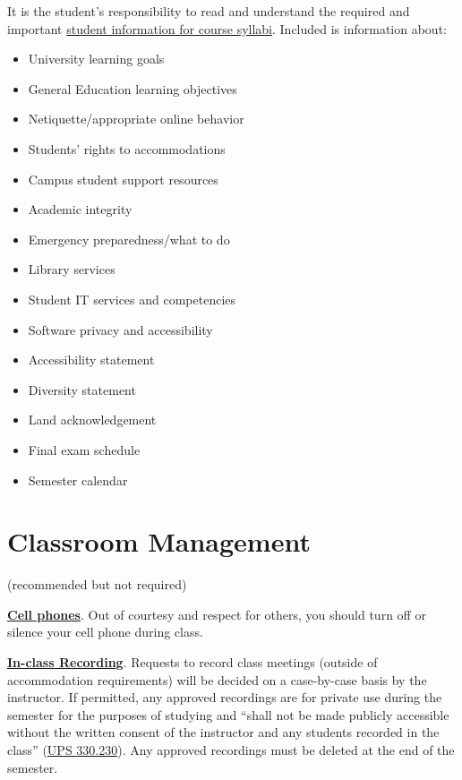 \documentclass[12pt]{article} %
\begin{document}
\noindent It is the student's responsibility to read and understand the required and important \href{https://fdc.fullerton.edu/teaching/student-info-syllabi.html}{student information for course syllabi}. Included is information about:

\begin{itemize}
\item University learning goals
\item General Education learning objectives
\item Netiquette/appropriate online behavior
\item Students' rights to accommodations
\item Campus student support resources
\item Academic integrity
\item Emergency preparedness/what to do
\item Library services
\item Student IT services and competencies
\item Software privacy and accessibility
\item Accessibility statement
\item Diversity statement
\item Land acknowledgement
\item Final exam schedule
\item Semester calendar
\end{itemize}

\section*{Classroom Management} {\color{annotationblue}(recommended but not required)}


\vspace{0.5em}

\noindent \textbf{\underline{Cell phones}}. {\color{suggestionred}Out of courtesy and respect for others, you should turn off or silence your cell phone during class.}

\vspace{0.5em}

\noindent \textbf{\underline{In-class Recording}}. {\color{suggestionred}Requests to record class meetings (outside of accommodation requirements) will be decided on a case-by-case basis by the instructor. If permitted, any approved recordings are for private use during the semester for the purposes of studying and ``shall not be made publicly accessible without the written consent of the instructor and any students recorded in the class'' (\href{https://www.fullerton.edu/senate/publications_policies_resolutions/ups/UPS\%20300/UPS\%20330.230.pdf}{UPS 330.230}). Any approved recordings must be deleted at the end of the semester.}
\end{document}
